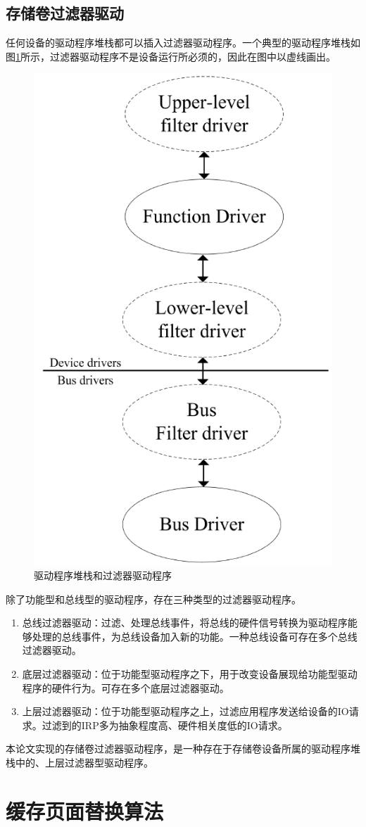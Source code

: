 \subsection{存储卷过滤器驱动}
任何设备的驱动程序堆栈都可以插入过滤器驱动程序。一个典型的驱动程序堆栈如图\ref{fig:io-stack-filter}所示，过滤器驱动程序不是设备运行所必须的，因此在图中以虚线画出。
\begin{figure}[H]
\centering
\includegraphics[width=0.4\linewidth]{./graph/io-stack-filter}
\caption{驱动程序堆栈和过滤器驱动程序}
\label{fig:io-stack-filter}
\end{figure}
除了功能型和总线型的驱动程序，存在三种类型的过滤器驱动程序。
\begin{enumerate}
\item
总线过滤器驱动：过滤、处理总线事件，将总线的硬件信号转换为驱动程序能够处理的总线事件，为总线设备加入新的功能。一种总线设备可存在多个总线过滤器驱动。
\item
底层过滤器驱动：位于功能型驱动程序之下，用于改变设备展现给功能型驱动程序的硬件行为。可存在多个底层过滤器驱动。
\item
上层过滤器驱动：位于功能型驱动程序之上，过滤应用程序发送给设备的IO请求。过滤到的IRP多为抽象程度高、硬件相关度低的IO请求。
\end{enumerate}

本论文实现的存储卷过滤器驱动程序，是一种存在于存储卷设备所属的驱动程序堆栈中的、上层过滤器型驱动程序。

\section{缓存页面替换算法}
\label{sec:cache_algorithm}

